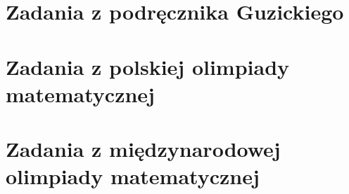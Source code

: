 \documentclass{greaseproof}
\begin{document}
\section{Zadania z podręcznika Guzickiego}


\section{Zadania z polskiej olimpiady matematycznej}


\section{Zadania z międzynarodowej olimpiady matematycznej}


{}


\raggedright
{}
\printindex

\printindex[persons]
\end{document}
